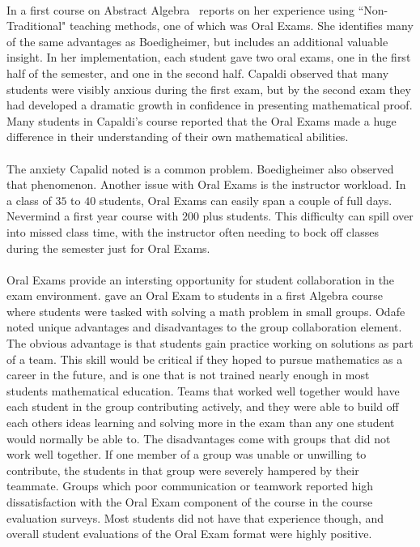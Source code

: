 \documentclass[12pt]{article}
\begin{document}
\paragraph{}
In a first course on Abstract Algebra~\cite{capaldi2014non} reports on her experience using ``Non-Traditional" teaching methods, one of which was Oral Exams. She identifies many of the same advantages as Boedigheimer, but includes an additional valuable insight. In her implementation, each student gave two oral exams, one in the first half of the semester, and one in the second half. Capaldi observed that many students were visibly anxious during the first exam, but by the second exam they had developed a dramatic growth in confidence in presenting mathematical proof. Many students in Capaldi's course reported that the Oral Exams made a huge difference in their understanding of their own mathematical abilities.
\paragraph{}
The anxiety Capalid noted is a common problem. Boedigheimer also observed that phenomenon. Another issue with Oral Exams is the instructor workload. In a class of $35$ to $40$ students, Oral Exams can easily span a couple of full days. Nevermind a first year course with $200$ plus students. This difficulty can spill over into missed class time, with the instructor often needing to bock off classes during the semester just for Oral Exams. 
\paragraph{}
Oral Exams provide an intersting opportunity for student collaboration in the exam environment. \cite{odafe2006oral} gave an Oral Exam to students in a first Algebra course where students were tasked with solving a math problem in small groups. Odafe noted unique advantages and disadvantages to the group collaboration element. The obvious advantage is that students gain practice working on solutions as part of a team. This skill would be critical if they hoped to pursue mathematics as a career in the future, and is one that is not trained nearly enough in most students mathematical education. Teams that worked well together would have each student in the group contributing actively, and they were able to build off each others ideas learning and solving more in the exam than any one student would normally be able to. The disadvantages come with groups that did not work well together. If one member of a group was unable or unwilling to contribute, the students in that group were severely hampered by their teammate. Groups which poor communication or teamwork reported high dissatisfaction with the Oral Exam component of the course in the course evaluation surveys. Most students did not have that experience though, and overall student evaluations of the Oral Exam format were highly positive.
\end{document}
